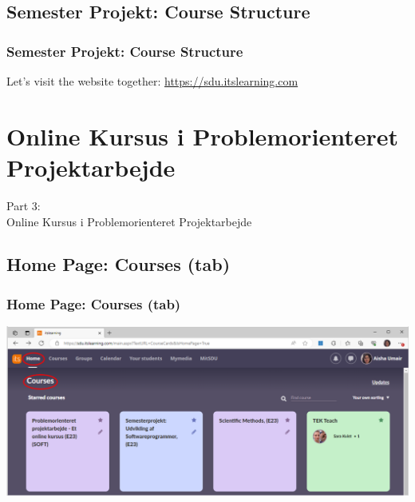 \documentclass[t, aspectratio=169]{beamer}
\begin{document}
\subsection{Semester Projekt: Course Structure}
\begin{frame}[fragile]
  \frametitle{Semester Projekt: Course Structure}
  \vspace{30mm}
  \begin{center}
    Let's visit the website together: \textcolor{blue}{\url{https://sdu.itslearning.com}}
  \end{center}
\end{frame}

\section{Online Kursus i Problemorienteret Projektarbejde}
\begin{frame}
  \vspace{25mm}
  \begin{center}
    \Huge{Part 3:\\Online Kursus i Problemorienteret Projektarbejde}
  \end{center}
\end{frame}

\subsection{Home Page: Courses (tab)}
\begin{frame}[fragile]
  \frametitle{Home Page: Courses (tab)}
  \vspace{9mm}
  \begin{center}
    \includegraphics[width=14cm]{figs/itslearning/courses.png}
  \end{center}
\end{frame}
\end{document}
